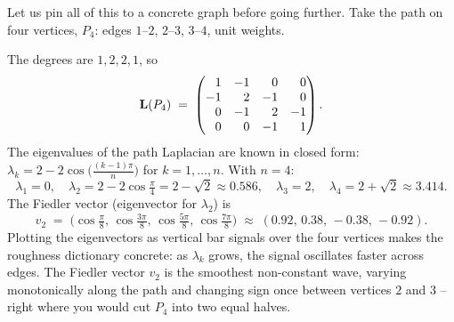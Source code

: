 Let us pin all of this to a concrete graph before going further. Take the path on four vertices, $P_4$: edges $1$--$2$, $2$--$3$, $3$--$4$, unit weights.

\begin{center}
\end{center}

The degrees are $1,2,2,1$, so
\[
  \mathbf{L}(P_4) \;=\;
  \begin{pmatrix}
    \phantom{-}1 & -1 & \phantom{-}0 & \phantom{-}0\\
    -1 & \phantom{-}2 & -1 & \phantom{-}0\\
    \phantom{-}0 & -1 & \phantom{-}2 & -1\\
    \phantom{-}0 & \phantom{-}0 & -1 & \phantom{-}1
  \end{pmatrix}.
\]
The eigenvalues of the path Laplacian are known in closed form: $\lambda_k = 2 - 2\cos\!\big(\tfrac{(k-1)\pi}{n}\big)$ for $k=1,\dots,n$. With $n=4$:
\[
  \lambda_1 = 0,\quad
  \lambda_2 = 2-2\cos\tfrac{\pi}{4}=2-\sqrt2\approx 0.586,\quad
  \lambda_3 = 2,\quad
  \lambda_4 = 2+\sqrt2\approx 3.414.
\]
The Fiedler vector (eigenvector for $\lambda_2$) is
\[
  v_2 \;=\; \big(\cos\tfrac{\pi}{8},\, \cos\tfrac{3\pi}{8},\, \cos\tfrac{5\pi}{8},\, \cos\tfrac{7\pi}{8}\big) \;\approx\; (0.92,\, 0.38,\, -0.38,\, -0.92) .
\]
Plotting the eigenvectors as vertical bar signals over the four vertices makes the roughness dictionary concrete: as $\lambda_k$ grows, the signal oscillates faster across edges. The Fiedler vector $v_2$ is the smoothest non-constant wave, varying monotonically along the path and changing sign once between vertices $2$ and $3$ -- right where you would cut $P_4$ into two equal halves.

